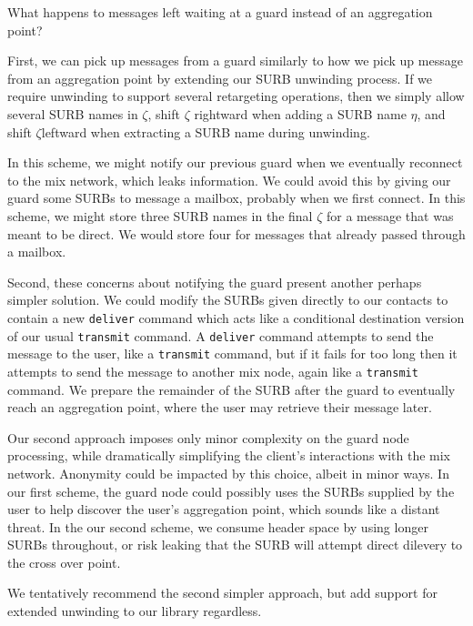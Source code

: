 \begin{issue}
What happens to messages left waiting at a guard instead of an
aggregation point?
\end{issue}

First, we can pick up messages from a guard similarly to how we pick
up message from an aggregation point by extending our SURB unwinding
process. If we require unwinding to support several retargeting
operations, then we simply allow several SURB names in $\zeta$,
 shift $\zeta$ rightward when adding a SURB name $\eta$, and
 shift $\zeta$leftward when extracting a SURB name during unwinding.

In this scheme, we might notify our previous guard when we
eventually reconnect to the mix network, which leaks information.
We could avoid this by giving our guard some SURBs to message a
mailbox, probably when we first connect.  In this scheme, we might
store three SURB names in the final $\zeta$ for a message that was
meant to be direct.  We would store four for messages that already
passed through a mailbox.


Second, these concerns about notifying the guard present another
perhaps simpler solution.  We could modify the SURBs given directly
to our contacts to contain a new {\tt deliver} command which acts
like a conditional destination version of our usual {\tt transmit}
command.  A {\tt deliver} command attempts to send the message to
the user, like a {\tt transmit} command, but if it fails for too long
then it attempts to send the message to another mix node, again like
a {\tt transmit} command.  We prepare the remainder of the SURB after
the guard to eventually reach an aggregation point, where the user
may retrieve their message later.

Our second approach imposes only minor complexity on the guard node
processing, while dramatically simplifying the client's interactions
with the mix network.  Anonymity could be impacted by this choice,
albeit in minor ways.
%
In our first scheme, the guard node could possibly uses the SURBs
supplied by the user to help discover the user's aggregation point,
which sounds like a distant threat.  
%
In the our second scheme, we consume header space by using longer
SURBs throughout, or risk leaking that the SURB will attempt direct
dilevery to the cross over point.

We tentatively recommend the second simpler approach, but add support
for extended unwinding to our library regardless.


